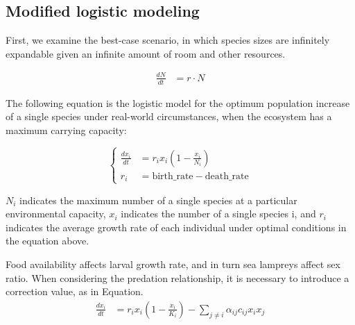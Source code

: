 \documentclass[12pt]{article}  %
\begin{document}
\subsection{Modified logistic modeling}
First, we examine the best-case scenario, in which species sizes are infinitely expandable given an infinite amount of room and other resources.\par
\begin{equation}
	\begin{aligned}
		\frac {dN}{dt} &= r \cdot N
	\end{aligned}
\end{equation}
\par
The following equation is the logistic model for the optimum population increase of a single species under real-world circumstances, when the ecosystem has a maximum carrying capacity:\par
\begin{equation}
	\left\{
	\begin{aligned}
		\frac {dx_ {i}}{dt} & = r_ {i}  x_ {i}  (1-  \frac {x_ {i}}{N_ {i}})	\\
		r_i &= \text{birth\_rate} - \text{death\_rate}
	\end{aligned}
	\right.
\end{equation}
\par
${N_ {i}}$ indicates the maximum number of a single species at a particular environmental capacity, $x_ {i} $ indicates the number of a single species i, and $r_i$ indicates the average growth rate of each individual under optimal conditions in the equation above. \par
Food availability affects larval growth rate, and in turn sea lampreys affect sex ratio. When considering the predation relationship, it is necessary to introduce a correction value, as in Equation.
\begin{equation}
	\begin{aligned}
		\frac{dx_i}{dt} &= r_i x_i \left(1 - \frac{x_i}{K_i}\right) - \sum_{j \neq i} \alpha_{ij} c_{ij} x_i x_j
	\end{aligned}
\end{equation}
\par
\end{document}

